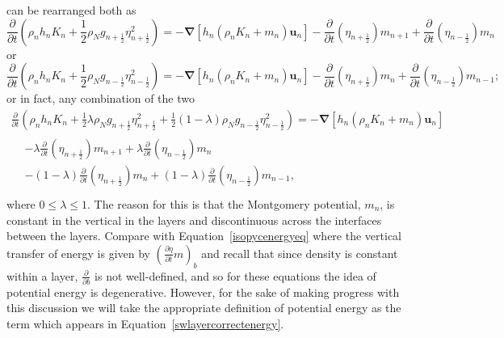 \documentclass[12pt,a4paper]{report}
\newcommand*\equref[1]{Equation~\eqref{#1}}
\newcommand*{\half}{\frac{1}{2}}
\begin{document}
    can be rearranged both as
    \begin{equation}
    \frac{\partial}{\partial t}\left(\rho_{n} h_{n} K_{n}+ 
    \half \rho_{N} g_{n+\half }\eta_{n+\half }^{2} \right) 
    = -\boldsymbol{\nabla} \left[h_{n} \left(\rho_{n}K_{n}+m_{n}\right) \boldsymbol{u}_{n}\right] 
    - \frac{\partial}{\partial t}\left(\eta_{n+\half }\right)   m_{n+1}
    + \frac{\partial}{\partial t}\left(\eta_{n-\half }\right) m_{n}
    \label{swlayercorrectenergy}
    \end{equation}
    or
    \begin{equation}
    \frac{\partial}{\partial t}\left(\rho_{n}h_{n} K_{n}+ 
    \half \rho_{N} g_{n-\half }\eta_{n-\half }^{2} \right) 
    = -\boldsymbol{\nabla} \left[h_{n} \left(\rho_{n}K_{n}+m_{n}\right) \boldsymbol{u}_{n}\right] 
    - \frac{\partial}{\partial t}\left(\eta_{n+\half }\right)   m_{n}
    + \frac{\partial}{\partial t}\left(\eta_{n-\half }\right) m_{n-1};
    \end{equation}
    or in fact, any combination of the two
    \begin{equation}
    \begin{split}
    \frac{\partial}{\partial t}\left(\rho_{n}h_{n} K_{n}+ 
    \half \lambda\rho_{N} g_{n+\half }\eta_{n+\half }^{2}  +
    \half \left(1-\lambda\right)\rho_{N} g_{n-\half }\eta_{n-\half }^{2} \right) 
    = -\boldsymbol{\nabla} \left[h_{n} \left(\rho_{n}K_{n}+m_{n}\right) \boldsymbol{u}_{n}\right] \\
    \begin{split}
    &- \lambda\frac{\partial}{\partial t}\left(\eta_{n+\half }\right)   m_{n+1}
    + \lambda\frac{\partial}{\partial t}\left(\eta_{n-\half }\right) m_{n} \\
    &- \left(1-\lambda\right)\frac{\partial}{\partial t}\left(\eta_{n+\half }\right)   m_{n}
    + \left(1-\lambda\right)\frac{\partial}{\partial t}\left(\eta_{n-\half }\right) m_{n-1}, \\
    \end{split}
    \end{split}
    \label{swlayergradedenergy}
    \end{equation}
    where $0 \leq \lambda \leq 1$. The reason for this is that the Montgomery potential,
    $m_{n}$, is constant in the vertical in the layers and discontinuous across the interfaces between the layers. Compare with \equref{isopycenergyeq} where the 
    vertical transfer of energy is given by 
    $\left(\frac{\partial \eta}{\partial t} m \right)_{b}$ and recall that since density is
     constant within a layer, $\frac{\partial }{\partial b}$ is not well-defined, and so for
      these equations the idea of potential energy is degenerative. However,
      for the sake of making progress with this discussion we will take the
      appropriate definition of potential energy as the term which appears in \equref{swlayercorrectenergy}.
    
\end{document}
